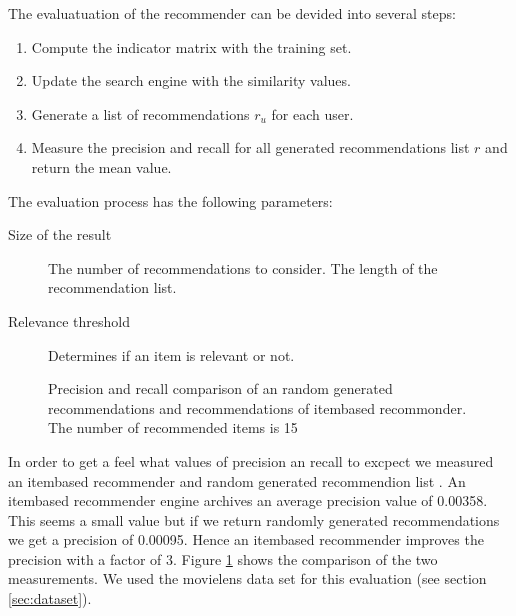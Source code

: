 The evaluatuation of the recommender can be devided into several steps:
\begin{enumerate}
\item  Compute the indicator matrix with the training set.
\item Update the search engine with the similarity values.
\item Generate a list of recommendations $r_u$ for each user.
\item Measure the precision and recall for all generated recommendations list $r$ and return the mean value.
\end{enumerate}

The evaluation process has the following parameters:
\begin{description}
\item[Size of the result] The number of recommendations to consider. The length of the recommendation list.
\item[Relevance threshold] Determines if an item is relevant or not.
\end{description}

\pgfplotsset{width=7cm}
\begin{figure}
  \centering
{} 
  \caption{Precision and recall comparison of an random generated recommendations and recommendations of itembased recommonder. The number of recommended items is 15}
  \label{fig:precisionrecallvalues}
\end{figure}

In order to get a feel what values of precision an recall to excpect we measured an itembased recommender and random generated recommendion list \cite{jannach11}.
An itembased recommender engine archives an average precision value of 0.00358. This seems a small value but if we return randomly generated recommendations we get a precision of 0.00095. Hence an itembased recommender improves the precision with a factor of 3. Figure \ref{fig:precisionrecallvalues} shows the comparison of the two measurements. We used the movielens data set for this evaluation (see section \ref{sec:dataset}).

